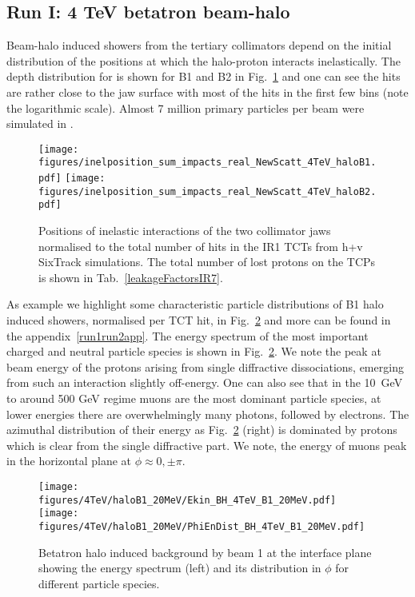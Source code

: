 \subsection{Run I: 4 TeV betatron beam-halo}

Beam-halo induced showers from the tertiary collimators depend on the initial distribution of the positions at which the halo-proton interacts inelastically.
The depth distribution for is shown for B1 and B2 in Fig.~\ref{inel4TeV} and one can see the hits are rather close to the jaw surface with most of the hits in the first few bins (note the logarithmic scale). Almost 7 million primary particles per beam were simulated in \fluka.

\begin{figure}[!htb]
\centering
\texttt{[image: figures/inelposition\_sum\_impacts\_real\_NewScatt\_4TeV\_haloB1.pdf]}
\texttt{[image: figures/inelposition\_sum\_impacts\_real\_NewScatt\_4TeV\_haloB2.pdf]}
 \caption{Positions of inelastic interactions of the two collimator jaws normalised to the total number of hits in the IR1 TCTs from h+v SixTrack simulations. The total number of lost protons on the TCPs is shown in Tab.~\ref{leakageFactorsIR7}.
  \label{inel4TeV}}
\end{figure}

As example we highlight some characteristic particle distributions of B1 halo induced showers, normalised per TCT hit, in Fig.~\ref{dist4TeVB1} and more can be found in the appendix~\ref{run1run2app}. The energy spectrum of the most important charged and neutral particle species is shown in Fig.~\ref{dist4TeVB1}. We note the peak at beam energy of the protons arising from single diffractive dissociations, emerging from such an interaction slightly off-energy. One can also see that in the 10~GeV to around 500 GeV regime muons are the most dominant particle species, at lower energies there are overwhelmingly many photons, followed by electrons. The azimuthal distribution of their energy as Fig.~\ref{dist4TeVB1} (right) is dominated by protons which is clear from the single diffractive part. We note, the energy of muons peak in the horizontal plane at $\phi \approx 0, \pm \pi$. 

\begin{figure}%
\begin{center}
\texttt{[image: figures/4TeV/haloB1\_20MeV/Ekin\_BH\_4TeV\_B1\_20MeV.pdf]}
\texttt{[image: figures/4TeV/haloB1\_20MeV/PhiEnDist\_BH\_4TeV\_B1\_20MeV.pdf]}
\end{center}
\vspace{-0.6cm}
 \caption{Betatron halo induced background by beam 1 at the interface plane showing the energy spectrum (left) and its distribution in $\phi$ for different particle species.
  \label{dist4TeVB1}}
\end{figure}

